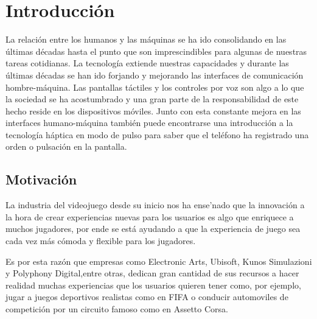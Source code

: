 %
%

\chapter{Introducci\'on}

La relaci\'on entre los humanos y las m\'aquinas se ha ido consolidando en las \'ultimas d\'ecadas hasta el punto que son imprescindibles para algunas de nuestras tareas cotidianas. La tecnolog\'ia extiende nuestras capacidades y durante las \'ultimas d\'ecadas se han ido forjando y mejorando las interfaces de comunicaci\'on hombre-m\'aquina. Las pantallas t\'actiles y los controles por voz son algo a lo que la sociedad se ha acostumbrado y una gran parte de la responsabilidad de este hecho reside en los dispositivos m\'oviles. Junto con esta constante mejora en las interfaces humano-m\'aquina tambi\'en puede encontrarse una introducci\'on a la tecnolog\'ia h\'aptica en modo de pulso para saber que el tel\'efono ha registrado una orden o pulsaci\'on en la pantalla.

\section{Motivaci\'on}
\label{cap1:sec:introduccion}

La industria del videojuego desde su inicio nos ha ense'nado que la innovaci\'on
 a la hora de crear experiencias nuevas para los usuarios es algo que enriquece a muchos jugadores, por ende se est\'a ayudando a que
la experiencia de juego sea cada vez m\'as c\'omoda y flexible para los jugadores.

Es por esta raz\'on que empresas como Electronic Arts, Ubisoft, Kunos Simulazioni y Polyphony Digital,entre otras, dedican gran cantidad de sus recursos
a hacer realidad muchas experiencias que los usuarios quieren tener como, por ejemplo,
 jugar a juegos deportivos realistas como en FIFA o conducir automoviles de competici\'on por un circuito famoso como en Assetto Corsa.

